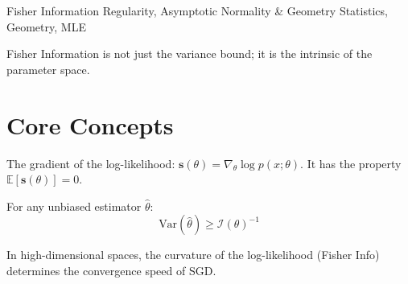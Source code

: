 \documentclass[12pt]{article}
\begin{document}
\MakeShortHeader
  {Fisher Information}
  {Regularity, Asymptotic Normality \& Geometry}
  {Statistics, Geometry, MLE}

\begin{KeyBox}
    Fisher Information is not just the variance bound; it is the intrinsic  of the parameter space.
\end{KeyBox}

\section{Core Concepts}

\begin{Definition}
    The gradient of the log-likelihood: $\mathbf{s}(\theta) = \nabla_\theta \log p(x;\theta)$.
    It has the property $\mathbb{E}[\mathbf{s}(\theta)] = 0$.
\end{Definition}

\begin{Theorem}
    For any unbiased estimator $\hat{\theta}$:
    \[ \text{Var}(\hat{\theta}) \ge \mathcal{I}(\theta)^{-1} \]
\end{Theorem}

\begin{Takeaway}
    In high-dimensional spaces, the curvature of the log-likelihood (Fisher Info) determines the convergence speed of SGD.
\end{Takeaway}
\end{document}
